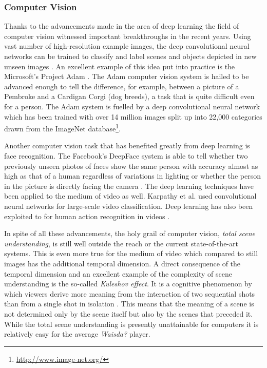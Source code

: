 \subsubsection{Computer Vision}
Thanks to the advancements made in the area of deep learning \cite{Bengio:2013:RLR:2498740.2498889,Arel:2010:RFD:1921914.1921920,Schmidhuber:deep-learning} the field of computer vision witnessed important breakthroughs in the recent years. Using vast number of high-resolution example images, the deep convolutional neural networks can be trained to classify and label scenes and objects depicted in new unseen images \cite{NIPS2012_4824,10.1109/TPAMI.2012.231}. An excellent example of this idea put into practice is the Microsoft's Project Adam \cite{project-adam}. The Adam computer vision system is hailed to be advanced enough to tell the difference, for example, between a picture of a Pembroke and a Cardigan Corgi (dog breeds), a task that is quite difficult even for a person. The Adam system is fuelled by a deep convolutional neural network which has been trained with over 14 million images split up into 22,000 categories drawn from the ImageNet database\footnote{\url{http://www.image-net.org/}}.

Another computer vision task that has benefited greatly from deep learning is face recognition. The Facebook's DeepFace system is able to tell whether two previously unseen photos of faces show the same person with accuracy almost as high as that of a human regardless of variations in lighting or whether the person in the picture is directly facing the camera \cite{Taigman_2014_CVPR,DBLP:conf/cvpr/ZhangPTFB15}. The deep learning techniques have been applied to the medium of video as well. Karpathy et al. used convolutional neural networks for large-scale video classification. Deep learning has also been exploited to for human action recognition in videos \cite{DBLP:journals/corr/SimonyanZ14,Ji:2013:CNN:2412386.2412939}.

In spite of all these advancements, the holy grail of computer vision, \textit{total scene understanding}, is still well outside the reach or the current state-of-the-art systems. This is even more true for the medium of video which compared to still images has the additional temporal dimension. A direct consequence of the temporal dimension and an excellent example of the complexity of scene understanding is the so-called \textit{Kuleshov effect}. It is a cognitive phenomenon by which viewers derive more meaning from the interaction of two sequential shots than from a single shot in isolation \cite{mobbs2006kuleshov}. This means that the meaning of a scene is not determined only by the scene itself but also by the scenes that preceded it. While the total scene understanding is presently unattainable for computers it is relatively easy for the average \textit{Waisda?} player.

